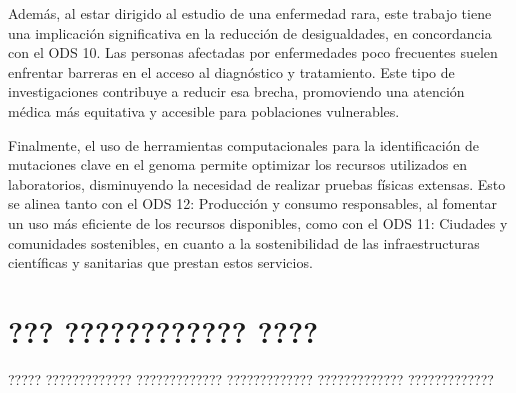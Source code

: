 \documentclass[11pt,spanish,listoffigures,listoftables]{tfgetsinf}
\begin{document}
Además, al estar dirigido al estudio de una enfermedad rara, este trabajo tiene una implicación significativa en la reducción de desigualdades, en concordancia con el ODS 10. Las personas afectadas por enfermedades poco frecuentes suelen enfrentar barreras en el acceso al diagnóstico y tratamiento. Este tipo de investigaciones contribuye a reducir esa brecha, promoviendo una atención médica más equitativa y accesible para poblaciones vulnerables.

Finalmente, el uso de herramientas computacionales para la identificación de mutaciones clave en el genoma permite optimizar los recursos utilizados en laboratorios, disminuyendo la necesidad de realizar pruebas físicas extensas. Esto se alinea tanto con el ODS 12: Producción y consumo responsables, al fomentar un uso más eficiente de los recursos disponibles, como con el ODS 11: Ciudades y comunidades sostenibles, en cuanto a la sostenibilidad de las infraestructuras científicas y sanitarias que prestan estos servicios.





\chapter{??? ???????????? ????}

????? ????????????? ????????????? ????????????? ????????????? ????????????? 



\end{document}
